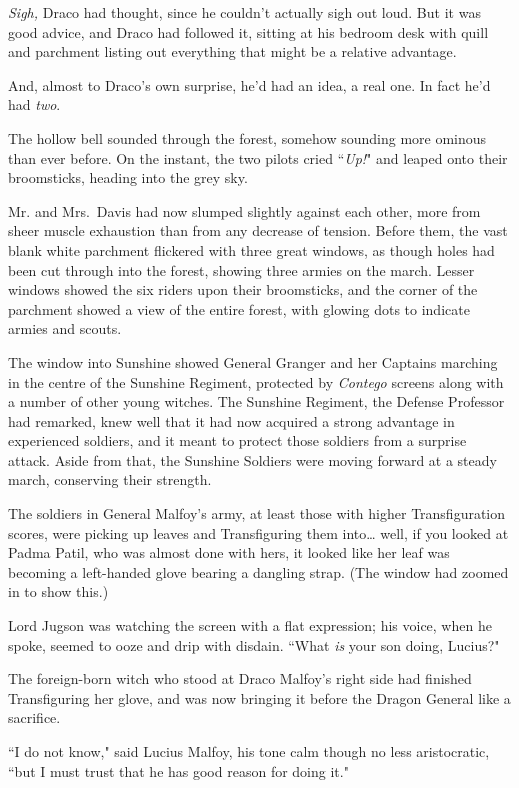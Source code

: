 \emph{Sigh,} Draco had thought, since he couldn't actually sigh out loud. But it was good advice, and Draco had followed it, sitting at his bedroom desk with quill and parchment listing out everything that might be a relative advantage.

And, almost to Draco's own surprise, he'd had an idea, a real one. In fact he'd had \emph{two}.

The hollow bell sounded through the forest, somehow sounding more ominous than ever before. On the instant, the two pilots cried ``\emph{Up!}" and leaped onto their broomsticks, heading into the grey sky.

\later

Mr. and Mrs.~Davis had now slumped slightly against each other, more from sheer muscle exhaustion than from any decrease of tension. Before them, the vast blank white parchment flickered with three great windows, as though holes had been cut through into the forest, showing three armies on the march. Lesser windows showed the six riders upon their broomsticks, and the corner of the parchment showed a view of the entire forest, with glowing dots to indicate armies and scouts.

The window into Sunshine showed General Granger and her Captains marching in the centre of the Sunshine Regiment, protected by \emph{Contego} screens along with a number of other young witches. The Sunshine Regiment, the Defense Professor had remarked, knew well that it had now acquired a strong advantage in experienced soldiers, and it meant to protect those soldiers from a surprise attack. Aside from that, the Sunshine Soldiers were moving forward at a steady march, conserving their strength.

The soldiers in General Malfoy's army, at least those with higher Transfiguration scores, were picking up leaves and Transfiguring them into{\ldots} well, if you looked at Padma Patil, who was almost done with hers, it looked like her leaf was becoming a left-handed glove bearing a dangling strap. (The window had zoomed in to show this.)

Lord Jugson was watching the screen with a flat expression; his voice, when he spoke, seemed to ooze and drip with disdain. ``What \emph{is} your son doing, Lucius?"

The foreign-born witch who stood at Draco Malfoy's right side had finished Transfiguring her glove, and was now bringing it before the Dragon General like a sacrifice.

``I do not know," said Lucius Malfoy, his tone calm though no less aristocratic, ``but I must trust that he has good reason for doing it."

